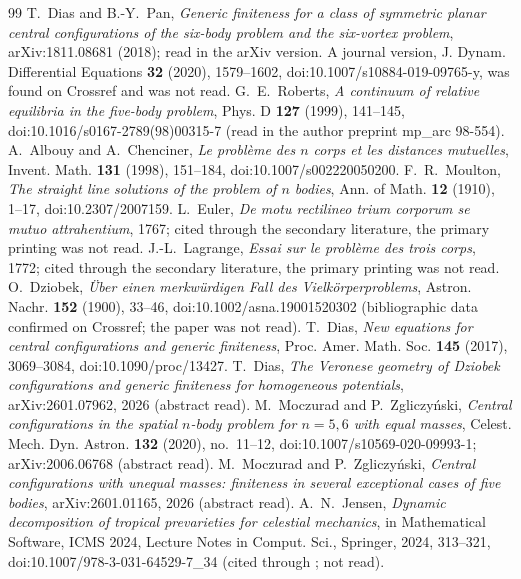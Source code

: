 \documentclass[11pt]{article}
\theoremstyle{definition}
\theoremstyle{remark}
\begin{document}
\begin{thebibliography}{99}
 T.~Dias and B.-Y.~Pan, \emph{Generic finiteness for a class of
symmetric planar central configurations of the six-body problem and the
six-vortex problem}, arXiv:1811.08681 (2018); read in the arXiv version. A journal version, J. Dynam. Differential Equations
\textbf{32} (2020), 1579--1602, doi:10.1007/s10884-019-09765-y, was found on Crossref and was not read.
 G.~E.~Roberts, \emph{A continuum of relative equilibria in
the five-body problem}, Phys. D \textbf{127} (1999), 141--145, doi:10.1016/s0167-2789(98)00315-7 (read in the author
preprint mp\_arc 98-554).
 A.~Albouy and A.~Chenciner, \emph{Le probl\`eme des $n$ corps
et les distances mutuelles}, Invent. Math. \textbf{131} (1998), 151--184, doi:10.1007/s002220050200.
 F.~R.~Moulton, \emph{The straight line solutions of the
problem of $n$ bodies}, Ann. of Math. \textbf{12} (1910), 1--17, doi:10.2307/2007159.
 L.~Euler, \emph{De motu rectilineo trium corporum se mutuo attrahentium}, 1767; cited
through the secondary literature, the primary printing was not read.
 J.-L.~Lagrange, \emph{Essai sur le probl\`eme des trois corps}, 1772; cited through the
secondary literature, the primary printing was not read.
 O.~Dziobek, \emph{\"Uber einen merkw\"urdigen Fall des Vielk\"orperproblems}, Astron. Nachr.
\textbf{152} (1900), 33--46, doi:10.1002/asna.19001520302 (bibliographic data confirmed on Crossref; the
paper was not read).
 T.~Dias, \emph{New equations for central configurations and generic finiteness}, Proc. Amer. Math. Soc.
\textbf{145} (2017), 3069--3084, doi:10.1090/proc/13427.
 T.~Dias, \emph{The Veronese geometry of Dziobek configurations and generic finiteness for homogeneous
potentials}, arXiv:2601.07962, 2026 (abstract read).
 M.~Moczurad and P.~Zgliczy\'nski, \emph{Central configurations in the spatial $n$-body problem for
$n=5,6$ with equal masses}, Celest. Mech. Dyn. Astron. \textbf{132} (2020), no.~11--12,
doi:10.1007/s10569-020-09993-1; arXiv:2006.06768 (abstract read).
 M.~Moczurad and P.~Zgliczy\'nski, \emph{Central configurations with unequal masses: finiteness in several
exceptional cases of five bodies}, arXiv:2601.01165, 2026 (abstract read).
 A.~N.~Jensen, \emph{Dynamic decomposition of tropical prevarieties for celestial mechanics}, in
Mathematical Software, ICMS 2024, Lecture Notes in Comput. Sci., Springer, 2024, 313--321,
doi:10.1007/978-3-031-64529-7\_34 (cited through \cite{JL25}; not read).

\end{thebibliography}
\end{document}

